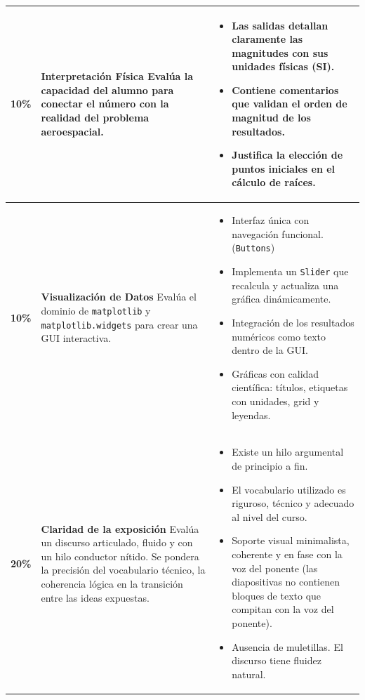\documentclass[11pt, a4paper]{article}
\begin{document}
\begin{tabularx}{\textwidth}{|p{1cm}|p{6.5cm}|p{10.2cm}|}
	\midrule
	\textbf{10\%} & \textbf{Interpretación Física} \newline \small Evalúa la capacidad del alumno para conectar el número con la realidad del problema aeroespacial.
	& \begin{itemize}[leftmargin=*, nosep]
		\item Las salidas detallan claramente las magnitudes con sus unidades físicas (SI).
		\item Contiene comentarios que validan el orden de magnitud de los resultados.
		\item Justifica la elección de puntos iniciales en el cálculo de raíces.
	\end{itemize}  \\
	\midrule
	\textbf{10\%} & \textbf{Visualización de Datos} \newline \small Evalúa el dominio de \texttt{matplotlib} y \texttt{matplotlib.widgets} para crear una GUI interactiva.
	& \begin{itemize}[leftmargin=*, nosep]
		\item Interfaz única con navegación funcional.(\texttt{Buttons}) 
		\item Implementa un \texttt{Slider} que recalcula y actualiza una gráfica dinámicamente.
		\item Integración de los resultados numéricos como texto dentro de la GUI.
		\item Gráficas con calidad científica: títulos, etiquetas con unidades, grid y leyendas.
	\end{itemize}  \\
		\midrule
	\textbf{20\%} & \textbf{Claridad de la exposición} 
	\newline \small Evalúa un discurso articulado, fluido y con un hilo conductor nítido. Se pondera la precisión del vocabulario técnico, la coherencia lógica en la transición entre las ideas expuestas.
	& \begin{itemize}[leftmargin=*, nosep]
		\item Existe un hilo argumental de principio a fin.
		\item El vocabulario utilizado es riguroso, técnico y adecuado al nivel del curso. 
		\item Soporte visual minimalista, coherente y en fase con la voz del ponente (las diapositivas no contienen bloques de texto que compitan con la voz del ponente).
		\item Ausencia de muletillas. El discurso tiene fluidez natural.
	\end{itemize}  \\
	\bottomrule
\end{tabularx}
\end{document}
